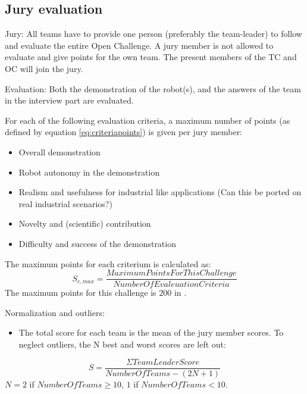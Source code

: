 \subsection{Jury​ ​evaluation}
Jury​:​ All teams have to provide one person (preferably the team-leader) to follow and evaluate the entire Open Challenge. A jury member is not allowed to evaluate and give points for the own team. The present members of the TC and OC will join the jury.  \par 
Evaluation:​ Both the demonstration of the robot(s), and the answers of the team in the interview part are evaluated. \par
For each of the following evaluation criteria, a maximum number of points (as defined by equation \ref{eq:criteriapoints}) is given per jury member:
\begin{itemize}
\item Overall demonstration
\item Robot autonomy in the demonstration
\item Realism and usefulness for industrial like applications (Can this be ported on real industrial scenarios?)
\item Novelty and (scientific) contribution
\item Difficulty and success of the demonstration
\end{itemize}

The maximum points for each criterium is calculated as:
\begin{equation}\label{eq:criteriapoints}
S_{c,max}=\frac{MaximumPointsForThisChallenge}{NumberOfEvaleuationCriteria}
\end{equation}
The maximum points for this challenge is 200 in \RCAW \YEAR .

Normalization​ ​and​ ​outliers:
\begin{itemize}
\item The total score for each team is the mean of the jury member scores. To neglect outliers, the N best and worst scores are left out:
\end{itemize}

\begin{equation}\label{eq:totalpoints}
S=\frac{\Sigma TeamLeaderScore}{NumberOfTeams−(2N+1)}
\end{equation} 
$N = 2$ if $NumberOfTeams \geq 10$, $1$ if $NumberOfTeams < 10$. \par




